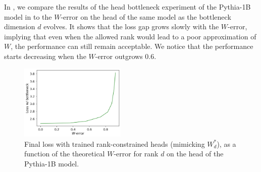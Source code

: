 In , we compare the results of the head bottleneck experiment of the Pythia-1B model in  to the $W$\!-error on the head of the same model as the bottleneck dimension $d$ evolves. It shows that the loss gap grows slowly with the $W$\!-error, implying that even when the allowed rank would lead to a poor approximation of $W$, the performance can still remain acceptable. We notice that the performance starts decreasing when the $W$\!-error outgrows 0.6.

\begin{figure}
\centering
    \includegraphics[width=0.45\textwidth]{sources/part_1/softmax_bottleneck/imgs/loss_v_werr.png}
    \caption{Final loss with trained rank-constrained heads (mimicking $W_d^*$), as a function of the theoretical $W$\!-error for rank $d$ on the head of the Pythia-1B model.}
    \vspace{-10pt}

    \label{fig:neg_res_thm}
\end{figure}






